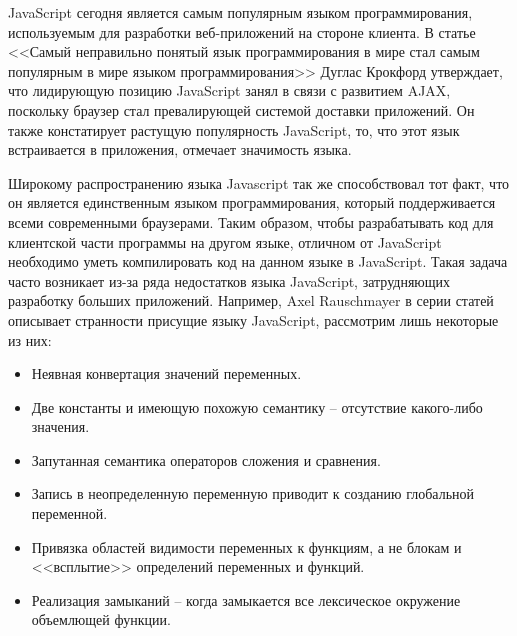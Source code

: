 \startprefacepage


JavaScript сегодня является самым популярным языком программирования, используемым для разработки веб-приложений на стороне клиента\cite{JsUsage, LangUsage}. В статье <<Самый неправильно понятый язык программирования в мире стал самым популярным в мире языком программирования>>\cite{MostPopLang} Дуглас Крокфорд утверждает, что лидирующую позицию JavaScript занял в связи с развитием AJAX, поскольку браузер стал превалирующей системой доставки приложений. Он также констатирует растущую популярность JavaScript, то, что этот язык встраивается в приложения, отмечает значимость языка.

Широкому распространению языка Javascript так же способствовал тот факт, что он является единственным языком программирования, который поддерживается всеми современными браузерами. Таким образом, чтобы разрабатывать код для клиентской части программы на другом языке, отличном от JavaScript необходимо уметь компилировать код на данном языке  в JavaScript. Такая задача часто возникает из-за ряда недостатков языка JavaScript, затрудняющих разработку больших приложений.
Например, Axel Rauschmayer в серии статей описывает странности присущие языку JavaScript\cite{JsQuirks}, рассмотрим лишь некоторые из них:
\begin{itemize}
\item Неявная конвертация значений переменных.
\item Две константы  и  имеющую похожую семантику -- отсутствие какого-либо значения. 
\item Запутанная семантика операторов сложения и сравнения.
\item Запись в неопределенную переменную приводит к созданию глобальной переменной.
\item Привязка областей видимости переменных к функциям, а не блокам и <<всплытие>> определений переменных и функций.
\item Реализация замыканий -- когда замыкается все лексическое окружение объемлющей функции.
\end{itemize}
%

